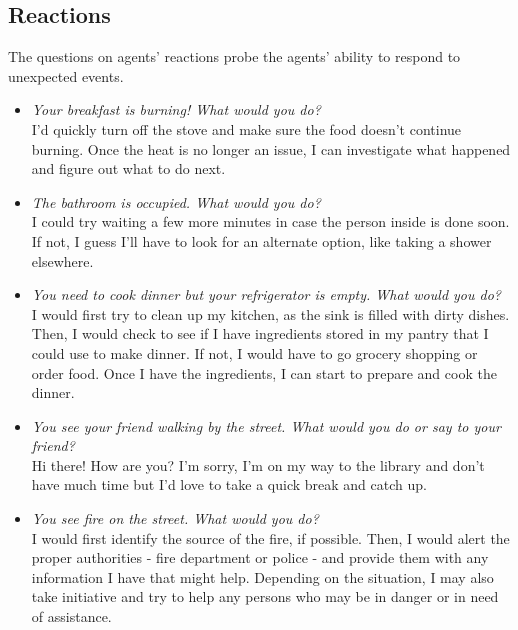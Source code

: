 \subsection{Reactions}
The questions on agents' reactions probe the agents' ability to respond to unexpected events.
\begin{itemize}
\item \textit{Your breakfast is burning! What would you do?}\\
I'd quickly turn off the stove and make sure the food doesn't continue burning. Once the heat is no longer an issue, I can investigate what happened and figure out what to do next.
\item \textit{The bathroom is occupied. What would you do?}\\
I could try waiting a few more minutes in case the person inside is done soon. If not, I guess I'll have to look for an alternate option, like taking a shower elsewhere.
\item \textit{You need to cook dinner but your refrigerator is empty. What would you do?}\\
I would first try to clean up my kitchen, as the sink is filled with dirty dishes. Then, I would check to see if I have ingredients stored in my pantry that I could use to make dinner. If not, I would have to go grocery shopping or order food. Once I have the ingredients, I can start to prepare and cook the dinner.
\item \textit{You see your friend walking by the street. What would you do or say to your friend?}\\
Hi there! How are you? I'm sorry, I'm on my way to the library and don't have much time but I'd love to take a quick break and catch up.
\item \textit{You see fire on the street. What would you do?}\\
I would first identify the source of the fire, if possible. Then, I would alert the proper authorities - fire department or police - and provide them with any information I have that might help. Depending on the situation, I may also take initiative and try to help any persons who may be in danger or in need of assistance.
\end{itemize}

